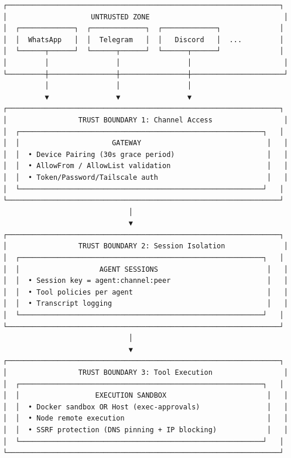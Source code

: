 \begin{lstlisting}
┌─────────────────────────────────────────────────────────────────┐
│                    UNTRUSTED ZONE                                │
│  ┌─────────────┐  ┌─────────────┐  ┌─────────────┐              │
│  │  WhatsApp   │  │  Telegram   │  │   Discord   │  ...         │
│  └──────┬──────┘  └──────┬──────┘  └──────┬──────┘              │
│         │                │                │                      │
└─────────┼────────────────┼────────────────┼──────────────────────┘
          │                │                │
          ▼                ▼                ▼
┌─────────────────────────────────────────────────────────────────┐
│                 TRUST BOUNDARY 1: Channel Access                 │
│  ┌──────────────────────────────────────────────────────────┐   │
│  │                      GATEWAY                              │   │
│  │  • Device Pairing (30s grace period)                      │   │
│  │  • AllowFrom / AllowList validation                       │   │
│  │  • Token/Password/Tailscale auth                          │   │
│  └──────────────────────────────────────────────────────────┘   │
└─────────────────────────────────────────────────────────────────┘
                              │
                              ▼
┌─────────────────────────────────────────────────────────────────┐
│                 TRUST BOUNDARY 2: Session Isolation              │
│  ┌──────────────────────────────────────────────────────────┐   │
│  │                   AGENT SESSIONS                          │   │
│  │  • Session key = agent:channel:peer                       │   │
│  │  • Tool policies per agent                                │   │
│  │  • Transcript logging                                     │   │
│  └──────────────────────────────────────────────────────────┘   │
└─────────────────────────────────────────────────────────────────┘
                              │
                              ▼
┌─────────────────────────────────────────────────────────────────┐
│                 TRUST BOUNDARY 3: Tool Execution                 │
│  ┌──────────────────────────────────────────────────────────┐   │
│  │                  EXECUTION SANDBOX                        │   │
│  │  • Docker sandbox OR Host (exec-approvals)                │   │
│  │  • Node remote execution                                  │   │
│  │  • SSRF protection (DNS pinning + IP blocking)            │   │
│  └──────────────────────────────────────────────────────────┘   │
└─────────────────────────────────────────────────────────────────┘

\end{lstlisting}
